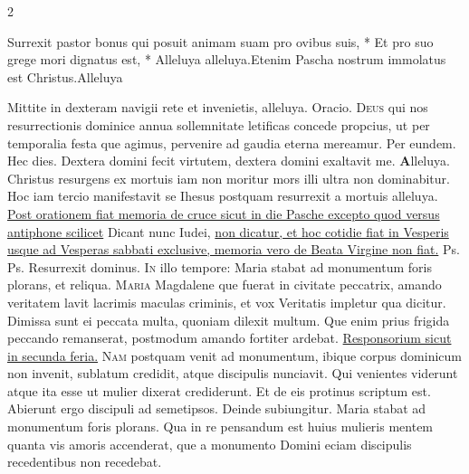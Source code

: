 \begin{multicols*}{2}
\begin{responsory-final}
{Surrexit pastor bonus qui posuit animam suam pro ovibus suis, * Et pro suo grege mori dignatus est, * Alleluya alleluya.}{Etenim Pascha nostrum immolatus est Christus.}{Alleluya}
\end{responsory-final}%
 Mittite in dexteram navigii rete et invenietis, alleluya. {\color{Red} Oracio.}
\lettrine[lines=2]{\zallmancaps \color{Red} D}{eus} qui nos resurrectionis dominice annua sollemnitate letificas concede propcius, ut per temporalia festa que agimus, pervenire ad gaudia eterna mereamur. Per eundem.
 \R Hec dies. \V Dextera domini fecit virtutem, dextera domini exaltavit me. {\color{Red} \bfseries A}lleluya. \V Christus resurgens ex mortuis iam non moritur mors illi ultra non dominabitur.
 Hoc iam tercio manifestavit se Ihesus postquam resurrexit a mortuis alleluya.
\newline \ul{Post orationem fiat memoria de cruce sicut in die Pasche excepto quod versus antiphone scilicet} Dicant nunc Iudei, \ul{non dicatur, et hoc cotidie fiat in Vesperis usque ad Vesperas sabbati exclusive, memoria vero de Beata Virgine non fiat.}
  {\color{Red} Ps.}  {\color{Red} Ps.}  \V Resurrexit dominus.
\lettrine[lines=2]{\zallmancaps \color{Blue} I}{n} illo tempore: Maria stabat ad monumentum foris plorans, et reliqua.
\lettrine[lines=2]{\zallmancaps \color{Red} M}{aria} Magdalene que fuerat in civitate peccatrix, amando veritatem lavit lacrimis maculas criminis, et vox Veritatis impletur qua dicitur. Dimissa sunt ei peccata multa, quoniam dilexit multum. Que enim prius frigida peccando remanserat, postmodum amando fortiter ardebat. \ul{Responsorium sicut in secunda feria.}
\lettrine[lines=2]{\zallmancaps \color{Blue} N}{am} postquam venit ad monumentum, ibique corpus dominicum non invenit, sublatum credidit, atque discipulis nunciavit. Qui venientes viderunt atque ita esse ut mulier dixerat crediderunt. Et de eis protinus scriptum est. Abierunt ergo discipuli ad semetipsos. Deinde subiungitur. Maria stabat ad monumentum foris plorans. Qua in re pensandum est huius mulieris mentem quanta vis amoris accenderat, que a monumento Domini eciam discipulis recedentibus non recedebat.

\end{multicols*}
